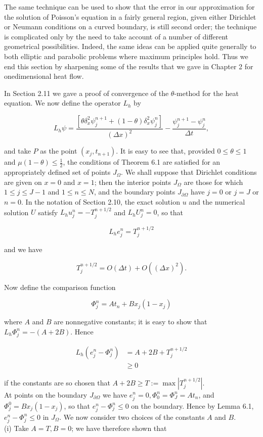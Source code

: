 \documentclass[10pt]{article}
\begin{document}
The same technique can be used to show that the error in our approximation for the solution of Poisson's equation in a fairly general region, given either Dirichlet or Neumann conditions on a curved boundary, is still second order; the technique is complicated only by the need to take account of a number of different geometrical possibilities. Indeed, the same ideas can be applied quite generally to both elliptic and parabolic problems where maximum principles hold. Thus we end this section by sharpening some of the results that we gave in Chapter 2 for onedimensional heat flow.

In Section 2.11 we gave a proof of convergence of the \(\theta\)-method for the heat equation. We now define the operator \(L_{h}\) by

\[
L_{h} \psi=\frac{\left[\theta \delta_{x}^{2} \psi_{j}^{n+1}+(1-\theta) \delta_{x}^{2} \psi_{j}^{n}\right]}{(\Delta x)^{2}}-\frac{\psi_{j}^{n+1}-\psi_{j}^{n}}{\Delta t},
\]

and take \(P\) as the point \(\left(x_{j}, t_{n+1}\right)\). It is easy to see that, provided \(0 \leq \theta \leq 1\) and \(\mu(1-\theta) \leq \frac{1}{2}\), the conditions of Theorem 6.1 are satisfied for an appropriately defined set of points \(J_{\Omega}\). We shall suppose that Dirichlet conditions are given on \(x=0\) and \(x=1\); then the interior points \(J_{\Omega}\) are those for which \(1 \leq j \leq J-1\) and \(1 \leq n \leq N\), and the boundary points \(J_{\partial \Omega}\) have \(j=0\) or \(j=J\) or \(n=0\). In the notation of Section 2.10, the exact solution \(u\) and the numerical solution \(U\) satisfy \(L_{h} u_{j}^{n}=-T_{j}^{n+1 / 2}\) and \(L_{h} U_{j}^{n}=0\), so that

\[
L_{h} e_{j}^{n}=T_{j}^{n+1 / 2}
\]

and we have

\[
T_{j}^{n+1 / 2}=O(\Delta t)+O\left((\Delta x)^{2}\right) .
\]

Now define the comparison function

\[
\Phi_{j}^{n}=A t_{n}+B x_{j}\left(1-x_{j}\right)
\]

where \(A\) and \(B\) are nonnegative constants; it is easy to show that \(L_{h} \Phi_{j}^{n}=-(A+2 B)\). Hence

\[
\begin{aligned}
L_{h}\left(e_{j}^{n}-\Phi_{j}^{n}\right) & =A+2 B+T_{j}^{n+1 / 2} \\
& \geq 0
\end{aligned}
\]

if the constants are so chosen that \(A+2 B \geq T:=\max \left|T_{j}^{n+1 / 2}\right|\).\\
At points on the boundary \(J_{\partial \Omega}\) we have \(e_{j}^{n}=0, \Phi_{0}^{n}=\Phi_{J}^{n}=A t_{n}\), and \(\Phi_{j}^{0}=B x_{j}\left(1-x_{j}\right)\), so that \(e_{j}^{n}-\Phi_{j}^{n} \leq 0\) on the boundary. Hence by Lemma 6.1, \(e_{j}^{n}-\Phi_{j}^{n} \leq 0\) in \(J_{\Omega}\). We now consider two choices of the constants \(A\) and \(B\).\\
(i) Take \(A=T, B=0\); we have therefore shown that
\end{document}
